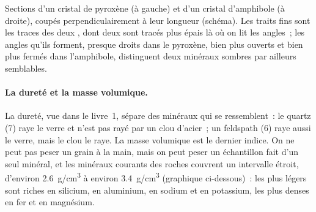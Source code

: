 \begin{omfigure}

{\small Sections d'un cristal de pyroxène (à gauche) et d'un cristal
d'amphibole (à droite), coupés perpendiculairement à leur longueur
(schéma). Les traits fins sont les traces des deux , dont deux sont
tracés plus épais là où on lit les angles~; les angles qu'ils forment,
presque droits dans le pyroxène, bien plus ouverts et bien plus fermés dans
l'amphibole, distinguent deux minéraux sombres par ailleurs semblables.}
\end{omfigure}

\paragraph{La dureté et la masse volumique.} La dureté, vue dans le
livre~1, sépare des minéraux qui se ressemblent~: le quartz (7) raye le
verre et n'est pas rayé par un clou d'acier~; un feldspath (6) raye aussi le
verre, mais le clou le raye. La masse volumique est le dernier indice. On
ne peut pas peser un grain à la main, mais on peut peser un échantillon fait
d'un seul minéral, et les minéraux courants des roches couvrent un
intervalle étroit, d'environ \qty{2.6}{g/cm^3} à environ \qty{3.4}{g/cm^3}
(graphique ci-dessous)~: les plus légers sont riches en silicium, en
aluminium, en sodium et en potassium, les plus denses en fer et en
magnésium.


